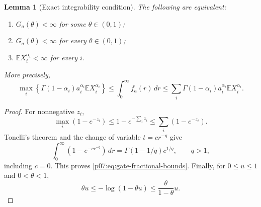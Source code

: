 \documentclass[11pt,letterpaper]{article}
\newtheorem{lemma}[theorem]{Lemma}
\theoremstyle{definition}
\theoremstyle{remark}
\newcommand{\E}{\mathbb E}
\newcommand{\1}{\mathbf 1}
\begin{document}
\begin{lemma}[Exact integrability condition]\label{p07:lem:gate-integrability}
The following are equivalent:
\begin{enumerate}[label=(\roman*)]
\item $G_a(\theta)<\infty$ for some $\theta\in(0,1)$;
\item $G_a(\theta)<\infty$ for every $\theta\in(0,1)$;
\item $\E X_i^{\alpha_i}<\infty$ for every $i$.
\end{enumerate}
More precisely,
\begin{equation}\label{p07:eq:gate-fractional-bounds}
 \max_i\left\{\Gamma(1-\alpha_i)a_i^{\alpha_i}
                   \E X_i^{\alpha_i}\right\}
 \leq\int_0^\infty f_a(r)\,dr
 \leq\sum_i\Gamma(1-\alpha_i)a_i^{\alpha_i}
                   \E X_i^{\alpha_i}.
\end{equation}
\end{lemma}
\begin{proof}
For nonnegative $z_i$,
\[
 \max_i(1-e^{-z_i})\leq1-e^{-\sum_i z_i}
 \leq\sum_i(1-e^{-z_i}).
\]
Tonelli's theorem and the change of variable $t=c r^{-q}$ give
\[
 \int_0^\infty(1-e^{-c r^{-q}})\,dr
 =\Gamma(1-1/q)c^{1/q},\qquad q>1,
\]
including $c=0$. This proves \eqref{p07:eq:gate-fractional-bounds}. Finally,
for $0\leq u\leq1$ and $0<\theta<1$,
\[
 \theta u\leq-\log(1-\theta u)
 \leq\frac{\theta}{1-\theta}u.
\]
\end{proof}
\end{document}
